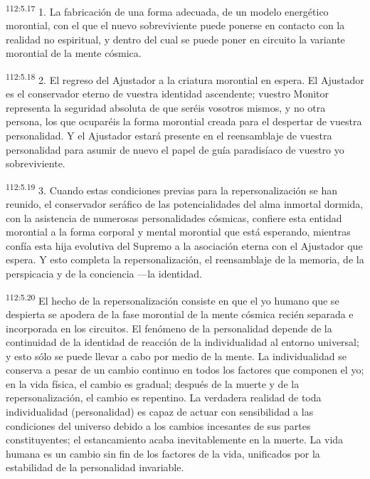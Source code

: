 \par
\textsuperscript{112:5.17} 1. La fabricación de una forma adecuada, de un modelo energético morontial, con el que el nuevo sobreviviente puede ponerse en contacto con la realidad no espiritual, y dentro del cual se puede poner en circuito la variante morontial de la mente cósmica.

\par
\textsuperscript{112:5.18} 2. El regreso del Ajustador a la criatura morontial en espera. El Ajustador es el conservador eterno de vuestra identidad ascendente; vuestro Monitor representa la seguridad absoluta de que seréis vosotros mismos, y no otra persona, los que ocuparéis la forma morontial creada para el despertar de vuestra personalidad. Y el Ajustador estará presente en el reensamblaje de vuestra personalidad para asumir de nuevo el papel de guía paradisíaco de vuestro yo sobreviviente.

\par
\textsuperscript{112:5.19} 3. Cuando estas condiciones previas para la repersonalización se han reunido, el conservador seráfico de las potencialidades del alma inmortal dormida, con la asistencia de numerosas personalidades cósmicas, confiere esta entidad morontial a la forma corporal y mental morontial que está esperando, mientras confía esta hija evolutiva del Supremo a la asociación eterna con el Ajustador que espera. Y esto completa la repersonalización, el reensamblaje de la memoria, de la perspicacia y de la conciencia ---la identidad.

\par
\textsuperscript{112:5.20} El hecho de la repersonalización consiste en que el yo humano que se despierta se apodera de la fase morontial de la mente cósmica recién separada e incorporada en los circuitos. El fenómeno de la personalidad depende de la continuidad de la identidad de reacción de la individualidad al entorno universal; y esto sólo se puede llevar a cabo por medio de la mente. La individualidad se conserva a pesar de un cambio continuo en todos los factores que componen el yo; en la vida física, el cambio es gradual; después de la muerte y de la repersonalización, el cambio es repentino. La verdadera realidad de toda individualidad (personalidad) es capaz de actuar con sensibilidad a las condiciones del universo debido a los cambios incesantes de sus partes constituyentes; el estancamiento acaba inevitablemente en la muerte. La vida humana es un cambio sin fin de los factores de la vida, unificados por la estabilidad de la personalidad invariable.

